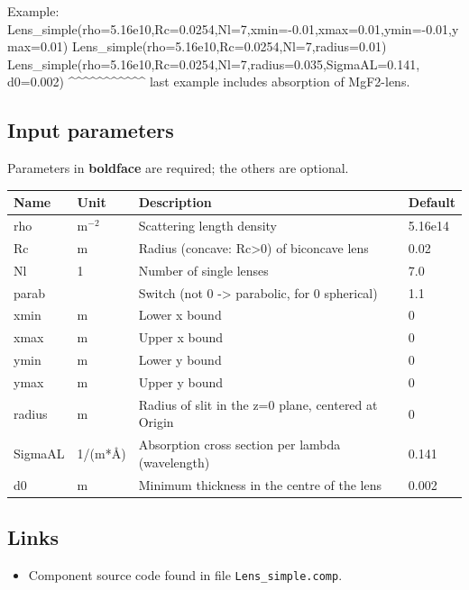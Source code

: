 Example: Lens\_simple(rho=5.16e10,Rc=0.0254,Nl=7,xmin=-0.01,xmax=0.01,ymin=-0.01,ymax=0.01) Lens\_simple(rho=5.16e10,Rc=0.0254,Nl=7,radius=0.01) Lens\_simple(rho=5.16e10,Rc=0.0254,Nl=7,radius=0.035,SigmaAL=0.141, d0=0.002) \textasciicircum{}\textasciicircum{}\textasciicircum{}\textasciicircum{}\textasciicircum{}\textasciicircum{}\textasciicircum{}\textasciicircum{}\textasciicircum{}\textasciicircum{}\textasciicircum{} last example includes absorption of MgF2-lens.

\subsection*{Input parameters}
Parameters in \textbf{boldface} are required; the others are optional.

\begin{longtable}{p{}p{}p{}p{}}
\toprule
\textbf{Name} & \textbf{Unit} & \textbf{Description} & \textbf{Default} \\
\midrule
\endhead
rho & m$^{-2}$ & Scattering length density & 5.16e14 \\
Rc & m & Radius (concave: Rc\textgreater{}0) of biconcave lens & 0.02 \\
Nl & 1 & Number of single lenses & 7.0 \\
parab &  & Switch (not 0 -\textgreater{} parabolic, for 0 spherical) & 1.1 \\
xmin & m & Lower x bound & 0 \\
xmax & m & Upper x bound & 0 \\
ymin & m & Lower y bound & 0 \\
ymax & m & Upper y bound & 0 \\
radius & m & Radius of slit in the z=0 plane, centered at Origin & 0 \\
SigmaAL & 1/(m*\AA{}) & Absorption cross section per lambda (wavelength) & 0.141 \\
d0 & m & Minimum thickness in the centre of the lens & 0.002 \\
\bottomrule
\end{longtable}

\subsection*{Links}
\begin{itemize}
  \item Component source code found in file \texttt{Lens\_simple.comp}.
\end{itemize}
